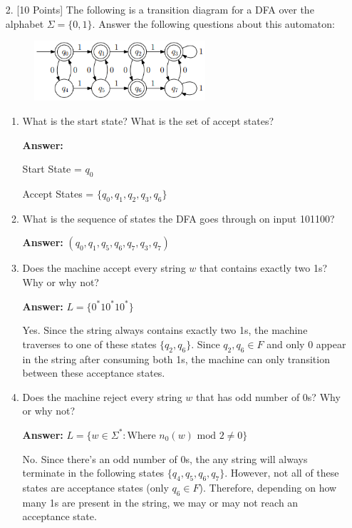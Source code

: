 \documentclass[12pt]{article}
\begin{document}
\begin{spacing}{1.5}
\begin{enumerate}
		\item[2.] [10 Points] The following is a transition diagram for a DFA over the alphabet $\Sigma = \{0,1\}$. Answer the following questions about this automaton:

		      \begin{figure}[h!]
			      \centering
			      \includegraphics[width=0.6\textwidth]{img/q2/q2_automata.png}
		      \end{figure}

		      \begin{enumerate}
			      \item What is the start state? What is the set of accept states?

			            \noindent \textbf{Answer:}

			            Start State = $q_0$

			            Accept States = $\{q_0, q_1, q_2, q_3, q_6\}$

			      \item What is the sequence of states the DFA goes through on input 101100?

			            \noindent \textbf{Answer:} $(q_0, q_1, q_5, q_6, q_7, q_3, q_7)$

			      \item Does the machine accept every string $w$ that contains exactly two 1s? Why or why not?

			            \noindent \textbf{Answer:} $L = \{0^*10^*10^* \}$

			            Yes. Since the string always contains exactly two 1s, the machine traverses to one of these states $\{q_2, q_6 \}$. Since $q_2, q_6 \in F$ and only 0 appear in the string after consuming both 1s, the machine can only transition between these acceptance states.

			      \item Does the machine reject every string $w$ that has odd number of 0s? Why or why not?

			            \noindent \textbf{Answer:} $L = \{w \in \Sigma^* : \text{Where $n_0(w)$ mod $2 \neq 0$} \}$

			            No. Since there's an odd number of 0s, the any string will always terminate in the following states $\{q_4, q_5, q_6, q_7 \}$. However, not all of these states are acceptance states (only $q_6 \in F$). Therefore, depending on how many 1s are present in the string, we may or may not reach an acceptance state.


\end{enumerate}
\end{enumerate}
\end{spacing}
\end{document}
